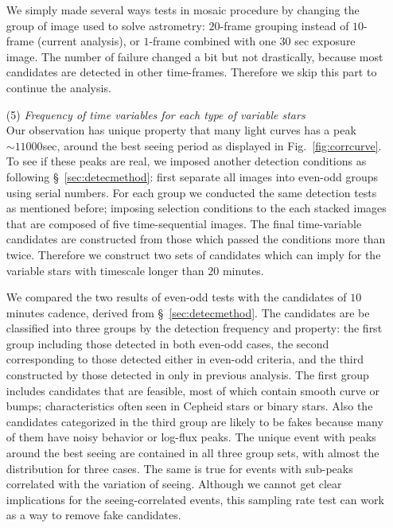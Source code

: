 \documentclass[iop, apj]{emulateapj}
\newcommand{\?}{\stackrel{?}{=}}
\begin{document}
\begin{itemize}
We simply made several ways tests in mosaic procedure by changing the group of image used to solve astrometry: $20$-frame grouping instead of $10$-frame (current analysis), or $1$-frame combined with one $30$ sec exposure image. 
The number of failure changed a bit but not drastically, because most candidates are detected in other time-frames. Therefore we skip this part to continue the analysis. 
%

\item[(5)]{\it Frequency of time variables for each type of variable stars}\\
\label{sec:sampling}
Our observation has unique property that many light curves has a peak $\sim11000$sec, around the best seeing period as displayed in Fig.~\ref{fig:corrcurve}. To see if these peaks are real, we imposed another detection conditions as following \S~\ref{sec:detecmethod}: first separate all images into even-odd groups using serial numbers. For each group we conducted the same detection tests as mentioned before; imposing selection conditions to the each stacked images that are composed of five time-sequential images. The final time-variable candidates are constructed from those which passed the conditions more than twice. Therefore we construct two sets of candidates which can imply for the variable stars with timescale longer than $20$ minutes. 

We compared the two results of even-odd tests with the candidates of $10$ minutes cadence, derived from \S~\ref{sec:detecmethod}. The candidates are be classified into three groups by the detection frequency and property: the first group including those detected in both even-odd cases, the second corresponding to those detected either in even-odd criteria, and the third constructed by those detected in only in previous analysis. The first group includes candidates that are feasible, most of which contain smooth curve or bumps; characteristics often seen in Cepheid stars or binary stars. 
Also the candidates categorized in the third group are likely to be fakes because many of them have noisy behavior or log-flux peaks. The unique event with peaks around the best seeing are contained in all three group sets, with almost the distribution for three cases. The same is true for events with sub-peaks correlated with the variation of seeing. Although we cannot get clear implications for the seeing-correlated events, this sampling rate test can work as a way to remove fake candidates. 
%
\end{itemize}
\end{document}
